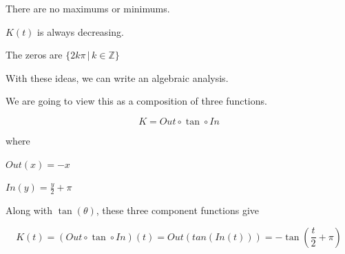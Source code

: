 \documentclass{ximera}
\begin{document}
\begin{idea}
\begin{image}
\end{image}

There are no maximums or minimums.

$K(t)$ is always decreasing.

The zeros are $\{  2 k \pi \, | \, k \in \mathbb{Z}    \}$


With these ideas, we can write an algebraic analysis.


\end{idea}












\begin{template}


We are going to view this as a composition of three functions.


\[
K = Out \circ \tan \circ In
\]


where


$Out(x) = -x$ 


$In(y) = \frac{y}{2} + \pi$ 




Along with $\tan(\theta)$, these three component functions give



\[
K(t) = (Out \circ \tan \circ In)(t) = Out(tan(In(t)))  = -\tan\left( \frac{t}{2} + \pi \right)
\]




\end{template}
\end{document}
